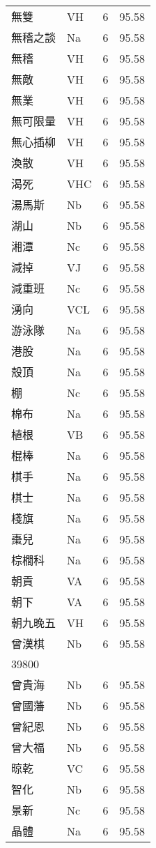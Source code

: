 \documentclass[twocolumn]{book}
\begin{document}
\begin{supertabular}{llrr}
無雙 & VH & 6 &  95.58\\
無稽之談 & Na & 6 &  95.58\\
無稽 & VH & 6 &  95.58\\
無敵 & VH & 6 &  95.58\\
無業 & VH & 6 &  95.58\\
無可限量 & VH & 6 &  95.58\\
無心插柳 & VH & 6 &  95.58\\
渙散 & VH & 6 &  95.58\\
渴死 & VHC & 6 &  95.58\\
湯馬斯 & Nb & 6 &  95.58\\
湖山 & Nb & 6 &  95.58\\
湘潭 & Nc & 6 &  95.58\\
減掉 & VJ & 6 &  95.58\\
減重班 & Nc & 6 &  95.58\\
湧向 & VCL & 6 &  95.58\\
游泳隊 & Na & 6 &  95.58\\
港股 & Na & 6 &  95.58\\
殼頂 & Na & 6 &  95.58\\
棚 & Nc & 6 &  95.58\\
棉布 & Na & 6 &  95.58\\
植根 & VB & 6 &  95.58\\
棍棒 & Na & 6 &  95.58\\
棋手 & Na & 6 &  95.58\\
棋士 & Na & 6 &  95.58\\
棧旗 & Na & 6 &  95.58\\
棗兒 & Na & 6 &  95.58\\
棕櫚科 & Na & 6 &  95.58\\
朝貢 & VA & 6 &  95.58\\
朝下 & VA & 6 &  95.58\\
朝九晚五 & VH & 6 &  95.58\\
曾漢棋 & Nb & 6 &  95.58\\
39800\\
曾貴海 & Nb & 6 &  95.58\\
曾國藩 & Nb & 6 &  95.58\\
曾紀恩 & Nb & 6 &  95.58\\
曾大福 & Nb & 6 &  95.58\\
晾乾 & VC & 6 &  95.58\\
智化 & Nb & 6 &  95.58\\
景新 & Nc & 6 &  95.58\\
晶體 & Na & 6 &  95.58\\

\end{supertabular}
\end{document}
